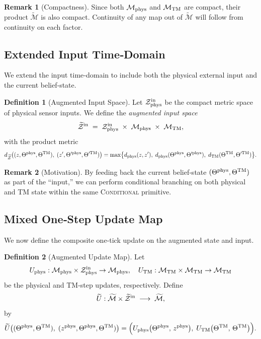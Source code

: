 \documentclass[12pt]{article}
\theoremstyle{definition}
\newtheorem{definition}{Definition}[section]
\newtheorem{remark}{Remark}[section]
\theoremstyle{plain}
\begin{document}
\begin{remark}[Compactness]
Since both \(\mathcal M_{\rm phys}\) and \(\mathcal M_{\rm TM}\) are compact, their product \(\widetilde{\mathcal M}\) is also compact.  Continuity of any map out of \(\widetilde{\mathcal M}\) will follow from continuity on each factor.
\end{remark}

\subsection{Extended Input Time‑Domain}
\label{subsec:augmented-input-domain}

We extend the input time‑domain to include both the physical external input and the current belief‑state.

\begin{definition}[Augmented Input Space]
Let 
\(\mathcal Z^{\rm in}_{\rm phys}\) be the compact metric space of physical sensor inputs.  We define the \emph{augmented input space}
\[
  \widetilde{\mathcal Z}^{\rm in}
  \;=\;
  \mathcal Z^{\rm in}_{\rm phys}
  \;\times\;
  \mathcal M_{\rm phys}
  \;\times\;
  \mathcal M_{\rm TM},
\]
with the product metric
\[
  d_{\widetilde{\mathcal Z}}
  \bigl((z,\Theta^{\rm phys},\Theta^{\rm TM}),\;(z',\Theta'^{\rm phys},\Theta'^{\rm TM})\bigr)
  =\max\bigl\{d_{\rm phys}(z,z'),\;d_{\rm phys}(\Theta^{\rm phys},\Theta'^{\rm phys}),\;d_{\rm TM}(\Theta^{\rm TM},\Theta'^{\rm TM})\bigr\}.
\]
\end{definition}

\begin{remark}[Motivation]
By feeding back the current belief‑state \((\Theta^{\rm phys},\Theta^{\rm TM})\) as part of the “input,” we can perform conditional branching on both physical and TM state within the same \textsc{Conditional} primitive.
\end{remark}

\subsection{Mixed One‑Step Update Map}
\label{subsec:augmented-update-map}

We now define the composite one‑tick update on the augmented state and input.

\begin{definition}[Augmented Update Map]
Let
\[
  U_{\rm phys}:\mathcal M_{\rm phys}\times\mathcal Z^{\rm in}_{\rm phys}\to\mathcal M_{\rm phys},
  \quad
  U_{\rm TM}:\mathcal M_{\rm TM}\times\mathcal M_{\rm TM}\to\mathcal M_{\rm TM}
\]
be the physical and TM‐step updates, respectively.  Define
\[
  \widetilde U:
    \widetilde{\mathcal M}\times\widetilde{\mathcal Z}^{\rm in}
  \;\longrightarrow\;
    \widetilde{\mathcal M},
\]
by
\[
  \widetilde U\bigl((\Theta^{\rm phys},\Theta^{\rm TM}),\;(z^{\rm phys},\Theta^{\rm phys},\Theta^{\rm TM})\bigr)
  =
  \Bigl(
    U_{\rm phys}\bigl(\Theta^{\rm phys},\,z^{\rm phys}\bigr),\;
    U_{\rm TM}\bigl(\Theta^{\rm TM},\,\Theta^{\rm TM}\bigr)
  \Bigr).
\]
\end{definition}
\end{document}
